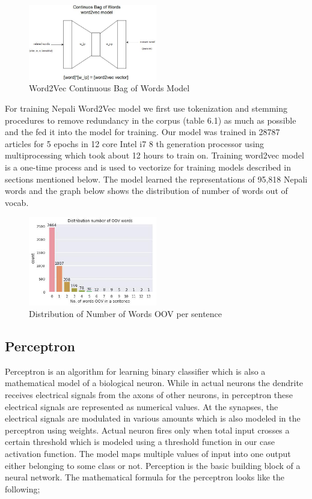         \begin{figure}[hbt!]
            \centering
                \includegraphics[width=0.5\textwidth]{./img/6.10.jpg}
                \caption{Word2Vec Continuous Bag of Words Model}
        \end{figure}
For training Nepali Word2Vec model we first use tokenization and stemming
procedures to remove redundancy in the corpus (table 6.1) as much as possible and the
fed it into the model for training. Our model was trained in 28787 articles for 5 epochs
in 12 core Intel i7 8 th generation processor using multiprocessing which took about 12
hours to train on. Training word2vec model is a one-time process and is used to
vectorize for training models described in sections mentioned below. The model
learned the representations of 95,818 Nepali words and the graph below shows the
distribution of number of words out of vocab.
        \begin{figure}[hbt!]
            \centering
                \includegraphics[width=0.5\textwidth]{./img/6.11.jpg}
                \caption{Distribution of Number of Words OOV per sentence}
        \end{figure}
        \subsection{Perceptron}
Perceptron is an algorithm for learning binary classifier which is also a mathematical
model of a biological neuron. While in actual neurons the dendrite receives electrical
signals from the axons of other neurons, in perceptron these electrical signals are
represented as numerical values. At the synapses, the electrical signals are modulated
in various amounts which is also modeled in the perceptron using weights. Actual
neuron fires only when total input crosses a certain threshold which is modeled using a
threshold function in our case activation function. The model maps multiple values of
input into one output either belonging to some class or not. Perception is the basic
building block of a neural network. The mathematical formula for the perceptron looks
like the following;

